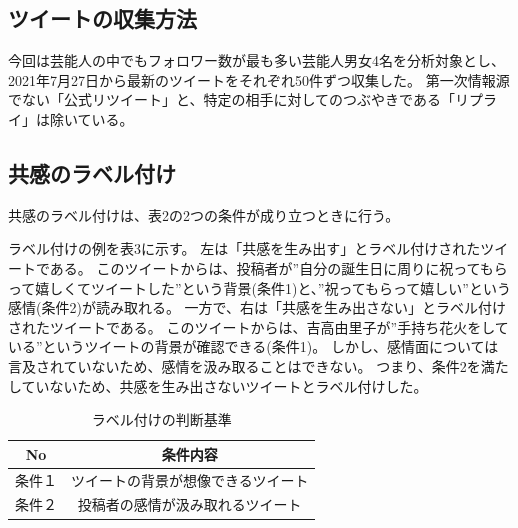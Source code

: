 \documentclass[dvipdfmx]{issj}
\begin{document}
\subsection{ツイートの収集方法 }  %
今回は芸能人の中でもフォロワー数が最も多い芸能人男女4名を分析対象とし、2021年7月27日から最新のツイートをそれぞれ50件ずつ収集した。
第一次情報源でない「公式リツイート」と、特定の相手に対してのつぶやきである「リプライ」は除いている。




\subsection{共感のラベル付け  }  %
共感のラベル付けは、表2の2つの条件が成り立つときに行う。



ラベル付けの例を表3に示す。
左は「共感を生み出す」とラベル付けされたツイートである。
このツイートからは、投稿者が”自分の誕生日に周りに祝ってもらって嬉しくてツイートした”という背景(条件1)と、”祝ってもらって嬉しい”という感情(条件2)が読み取れる。
一方で、右は「共感を生み出さない」とラベル付けされたツイートである。
このツイートからは、吉高由里子が”手持ち花火をしている”というツイートの背景が確認できる(条件1)。
しかし、感情面については言及されていないため、感情を汲み取ることはできない。
つまり、条件2を満たしていないため、共感を生み出さないツイートとラベル付けした。

\begin{table}[t]\centering
\caption{ラベル付けの判断基準}\label{tbl:font}
\begin{small}
\begin{tabular}{c|c} \hline\hline
No & 条件内容\\\hline
条件１& ツイートの背景が想像できるツイート\\
条件２ & 投稿者の感情が汲み取れるツイート\\\hline
\end{tabular}
\end{small}
\end{table}
\end{document}
